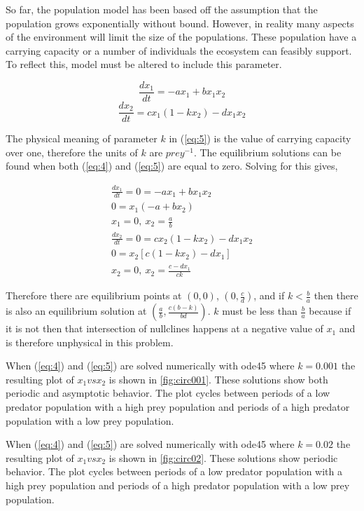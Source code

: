 \documentclass[12pt]{article}   %
\theoremstyle{definition}
\numberwithin{equation}{section}
\begin{document}
\quad So far, the population model has been based off the assumption that the population grows exponentially without bound. However, in reality many aspects of the environment will limit the size of the populations. These population have a carrying capacity or a number of individuals the ecosystem can feasibly support. To reflect this, model must be altered to include this parameter.    

\begin{equation}
  \frac{dx_1}{dt} = -ax_1 + bx_1x_2
  \label{eq:4}
\end{equation}
\begin{equation}
  \frac{dx_2}{dt}= cx_1(1-kx_2) - dx_1x_2 
  \label{eq:5}
\end{equation}

\quad The physical meaning of parameter $k$ in (\ref{eq:5}) is the value of carrying capacity over one, therefore the units of $k$ are $prey^{-1}$.  The equilibrium solutions can be found when both (\ref{eq:4}) and (\ref{eq:5}) are equal to zero.  Solving for this gives,

\begin{align*}
  \frac{dx_1}{dt} =0= -ax_1 + bx_1x_2\\
  0=x_1(-a+bx_2)\\
  x_1=0,\ x_2=\frac{a}{b}\\
  \frac{dx_2}{dt}=0= cx_2(1-kx_2) - dx_1x_2\\
  0=x_2[c(1-kx_2)-dx_1]\\
  x_2=0,\ x_2=\frac{c-dx_1}{ck}
\end{align*}

\quad Therefore there are equilibrium points at $(0,0)$, $(0,\frac{c}{d})$, and if $k<\frac{b}{a}$ then there is also an equilibrium solution at $(\frac{a}{b},\frac{c(b-k)}{bd})$. $k$ must be less than $\frac{b}{a}$ because if it is not then that intersection of nullclines happens at a negative value of $x_1$ and is therefore unphysical in this problem.


\quad When (\ref{eq:4}) and (\ref{eq:5}) are solved numerically with ode45 where $k=0.001$ the resulting plot of $x_1 vs x_2$ is shown in \autoref{fig:circ001}.  These solutions show both periodic and asymptotic behavior. The plot cycles between periods of a low predator population with a high prey population and periods of a high predator population with a low prey population. 

\quad When (\ref{eq:4}) and (\ref{eq:5}) are solved numerically with ode45 where $k=0.02$ the resulting plot of $x_1 vs x_2$ is shown in \autoref{fig:circ02}.  These solutions show periodic behavior. The plot cycles between periods of a low predator population with a high prey population and periods of a high predator population with a low prey population. 
\end{document}
